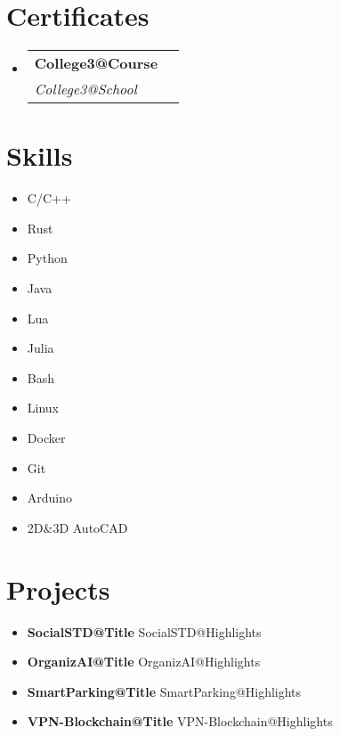 \documentclass[letterpaper,11pt]{article}
\makeatletter
\newcommand{\resumeSubheading}[4]{
  \vspace{-2pt}\item
    \begin{tabular*}{1.0\textwidth}[t]{l@{\extracolsep{\fill}}r}
      \textbf{#1} & \textbf{\small #2} \\
      \textit{\small#3} & \textit{\small #4} \\
    \end{tabular*}\vspace{-7pt}
}
\newcommand{\resumeSubHeadingListStart}{\begin{itemize}[leftmargin=0.0in, label={}]}
\newcommand{\resumeSubHeadingListEnd}{\end{itemize}}
\makeatother
\begin{document}
\section{Certificates}
  \resumeSubHeadingListStart
      \resumeSubheading{\csname College3@Course\endcsname}
      {}
      {\csname College3@School\endcsname}{}
  \resumeSubHeadingListEnd
\vspace{1pt}
    
\section{Skills}
\begin{multicols}{2}
    \setlength{\columnsep}{0pt}
    \begin{itemize}[leftmargin=0.15in, label={}]
        \item{{C/C++}\dotfill}
        \item{{Rust}\dotfill}
        \item{{Python}\dotfill}
        \item{{Java}\dotfill}
        \item{{Lua}\dotfill}
        \item{{Julia}\dotfill}
        \item{{Bash}\dotfill}
        \item{{Linux}\dotfill}
        \item{{Docker}\dotfill}
        \item{{Git}\dotfill}
        \item{{Arduino}\dotfill}
        \item{{2D\&3D AutoCAD}\dotfill}
    \end{itemize}
\end{multicols}


\newcommand{\renderGit}[1]{
    \item \textbf{\csname #1@Title\endcsname}
    \csname #1@Highlights\endcsname
}

\section{Projects}
\resumeSubHeadingListStart
    \renderGit{SocialSTD}
    \renderGit{OrganizAI}
    \renderGit{SmartParking}
    \renderGit{VPN-Blockchain}
\resumeSubHeadingListEnd
\end{document}
